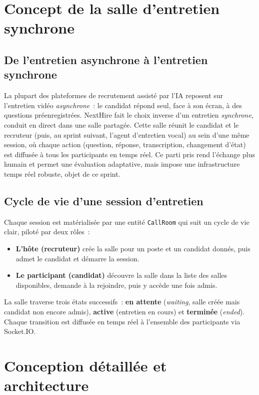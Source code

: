 \section{Concept de la salle d'entretien synchrone}

\subsection{De l'entretien asynchrone à l'entretien synchrone}

La plupart des plateformes de recrutement assisté par l'IA reposent sur l'entretien vidéo \textit{asynchrone}~: le candidat répond seul, face à son écran, à des questions préenregistrées. NextHire fait le choix inverse d'un entretien \textit{synchrone}, conduit en direct dans une salle partagée. Cette salle réunit le candidat et le recruteur (puis, au sprint suivant, l'agent d'entretien vocal) au sein d'une même session, où chaque action (question, réponse, transcription, changement d'état) est diffusée à tous les participants en temps réel. Ce parti pris rend l'échange plus humain et permet une évaluation adaptative, mais impose une infrastructure temps réel robuste, objet de ce sprint.

\subsection{Cycle de vie d'une session d'entretien}

Chaque session est matérialisée par une entité \texttt{CallRoom} qui suit un cycle de vie clair, piloté par deux rôles~:

\begin{itemize}
  \item \textbf{L'hôte (recruteur)} crée la salle pour un poste et un candidat donnés, puis admet le candidat et démarre la session.
  \item \textbf{Le participant (candidat)} découvre la salle dans la liste des salles disponibles, demande à la rejoindre, puis y accède une fois admis.
\end{itemize}

La salle traverse trois états successifs~: \textbf{en attente} (\textit{waiting}, salle créée mais candidat non encore admis), \textbf{active} (entretien en cours) et \textbf{terminée} (\textit{ended}). Chaque transition est diffusée en temps réel à l'ensemble des participants via Socket.IO.

\section{Conception détaillée et architecture}

